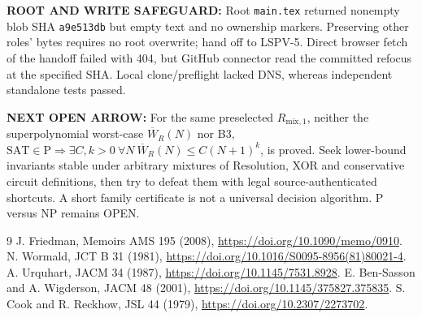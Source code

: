\documentclass[11pt]{article}
\begin{document}
\textbf{ROOT AND WRITE SAFEGUARD:} Root \texttt{main.tex} returned nonempty blob SHA \texttt{a9e513db} but empty text and no ownership markers. Preserving other roles' bytes requires no root overwrite; hand off to LSPV-5. Direct browser fetch of the handoff failed with 404, but GitHub connector read the committed refocus at the specified SHA. Local clone/preflight lacked DNS, whereas independent standalone tests passed.

\textbf{NEXT OPEN ARROW:} For the same preselected $R_{\mathrm{mix},1}$, neither the superpolynomial worst-case $\overline W_R(N)$ nor B3,
$\mathrm{SAT}\in\mathrm P\Longrightarrow\exists C,k>0\ \forall N\
\overline W_R(N)\le C(N+1)^k$, is proved. Seek lower-bound invariants stable under arbitrary mixtures of Resolution, XOR and conservative circuit definitions, then try to defeat them with legal source-authenticated shortcuts. A short family certificate is not a universal decision algorithm. P versus NP remains OPEN.

\begin{thebibliography}{9}
 J. Friedman, Memoirs AMS 195 (2008), \url{https://doi.org/10.1090/memo/0910}.
\bibitem{w} N. Wormald, JCT B 31 (1981), \url{https://doi.org/10.1016/S0095-8956(81)80021-4}.
\bibitem{u} A. Urquhart, JACM 34 (1987), \url{https://doi.org/10.1145/7531.8928}.
\bibitem{b} E. Ben-Sasson and A. Wigderson, JACM 48 (2001), \url{https://doi.org/10.1145/375827.375835}.
\bibitem{c} S. Cook and R. Reckhow, JSL 44 (1979), \url{https://doi.org/10.2307/2273702}.
\end{thebibliography}
\end{document}
